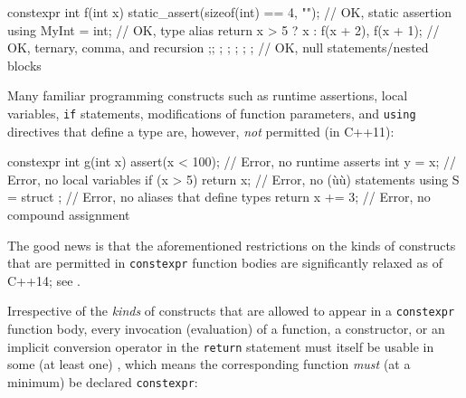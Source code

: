 \begin{emcppslisting}[emcppserrorlines={6}]
constexpr int f(int x)
{
    static_assert(sizeof(int) == 4, "");   // OK, static assertion
    using MyInt = int;                     // OK, type alias
    return x > 5 ? x : f(x + 2), f(x + 1); // OK, ternary, comma, and recursion
    ;; ;   ; { ; { ; ; } }                 // OK, null statements/nested blocks
}
\end{emcppslisting}
    

\noindent Many familiar programming constructs such as runtime assertions, local
variables, \lstinline!if! statements, modifications of function parameters,
and \lstinline!using! directives that define a type are, however,
\emph{not} permitted (in C++11):

\begin{emcppslisting}[emcppsignore={all errors}]
constexpr int g(int x)
{
    assert(x < 100);          // Error, no runtime asserts
    int y = x;                // Error, no local variables
    if (x > 5) { return x; }  // Error, no (ù{}ù) statements
    using S = struct { };     // Error, no aliases that define types
    return x += 3;            // Error, no compound assignment
}
\end{emcppslisting}
    

\noindent The good news is that the aforementioned restrictions on the kinds of
constructs that are permitted in \lstinline!constexpr! function bodies are
significantly relaxed as of C++14; see .

Irrespective of the \emph{kinds} of constructs that are allowed to
appear in a \lstinline!constexpr! function body, every invocation
(evaluation) of a function, a constructor, or an implicit conversion
operator in the \lstinline!return! statement must itself be usable in some
(at least one) , which means the
corresponding function \emph{must} (at a minimum) be declared
\lstinline!constexpr!:

